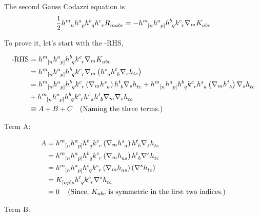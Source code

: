 The second Gauss Codazzi equation is
\begin{equation}
     \frac{1}{2} \tt{h}{m}{n} \tt{h}{a}{p} \tt{h}{b}{q} \tt{h}{c}{r} \tt{R}{}{mabc}=-\tt{h}{m}{[n} \tt{h}{a}{p]} \tt{h}{b}{q} \tt{k}{c}{r} \nabla_m \tt{K}{}{abc} \label{secondGaussCodacci}
\end{equation}
 

To prove it, let's start with the -RHS,

\begin{align*}
    \text{-RHS} &= \tt{h}{m}{[n} \tt{h}{a}{p]} \tt{h}{b}{q} \tt{k}{c}{r} \nabla_m \tt{K}{}{abc} \\
    &= \tt{h}{m}{[n} \tt{h}{a}{p]} \tt{h}{b}{q} \tt{k}{c}{r} \nabla_m \lera{\tt{h}{s}{a} \tt{h}{t}{b} \nabla_s h_{tc}}\\
    &= \tt{h}{m}{[n} \tt{h}{a}{p]} \tt{h}{b}{q} \tt{k}{c}{r} \lera{ \nabla_m \tt{h}{s}{a}} \tt{h}{t}{b} \nabla_s \tt{h}{}{tc} + \tt{h}{m}{[n} \tt{h}{a}{p]} \tt{h}{b}{q} \tt{k}{c}{r} \tt{h}{s}{a} \lera{ \nabla_m\tt{h}{t}{b}} \nabla_s \tt{h}{}{tc} \\
    &+ \tt{h}{m}{[n} \tt{h}{a}{p]} \tt{h}{b}{q} \tt{k}{c}{r} \tt{h}{s}{a} \tt{h}{t}{b} \nabla_m \nabla_s \tt{h}{}{tc} \\
    & \equiv A+B+C \quad \text{(Naming the three terms.)}
\end{align*}


Term A:

\begin{align*}
    A &= \tt{h}{m}{[n} \tt{h}{a}{p]} \tt{h}{b}{q} \tt{k}{c}{r} \lera{ \nabla_m \tt{h}{s}{a}} \tt{h}{t}{b} \nabla_s \tt{h}{}{tc}\\
    &= \tt{h}{m}{[n} \tt{h}{a}{p]} \tt{h}{b}{q} \tt{k}{c}{r} \lera{ \nabla_m \tt{h}{}{as}} \tt{h}{t}{b} \nabla^s \tt{h}{}{tc} \\
    &= \tt{h}{m}{[n} \tt{h}{a}{p]} \tt{h}{t}{q} \tt{k}{c}{r} \lera{ \nabla_m \tt{h}{}{as}} \lera{ \nabla^s \tt{h}{}{tc}} \\
    &= \tt{K}{}{[np]s} \tt{h}{t}{q} \tt{k}{c}{r} \nabla^s \tt{h}{}{tc} \\
    &= 0 \quad \lera{\text{Since, $K_{abc}$ is symmetric in the first two indices.}}
\end{align*}


Term B:


